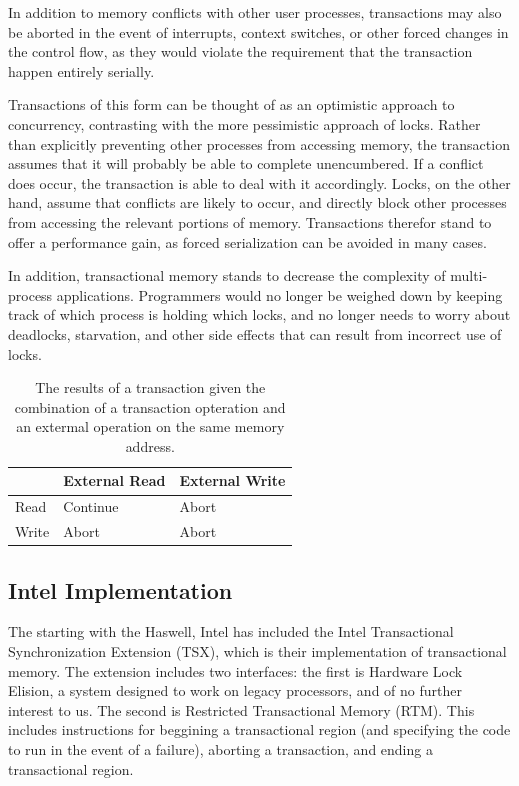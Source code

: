 \documentclass{acm_proc_article-sp}
\begin{document}
In addition to memory conflicts with other user processes, 
transactions may also be aborted in the event of interrupts, context switches,
or other forced changes in the control flow, as they would violate the
requirement that the transaction happen entirely serially. 

Transactions of this form can be thought of as an optimistic approach to
concurrency, contrasting with the more pessimistic approach of locks. 
Rather than explicitly preventing other processes from accessing memory, the
transaction assumes that it will probably be able to complete unencumbered. If
a conflict does occur, the transaction is able to deal with it accordingly.
Locks, on the other hand, assume that conflicts are likely to occur, and 
directly block other processes from accessing the relevant portions of memory.
Transactions therefor stand to offer a performance gain, as forced 
serialization can be avoided in many cases.

In addition, transactional memory stands to decrease the complexity of 
multi-process applications. Programmers would no longer be weighed down by 
keeping track of which process is holding which locks, and no longer needs
to worry about deadlocks, starvation, and other side effects that can result
from incorrect use of locks.

\begin{table}
\begin{center}
    \begin{tabular}{ l | l | l }
     & External Read & External Write \\
    \hline
    Read & Continue & Abort \\
    \hline
    Write & Abort & Abort \\
    \hline
    \end{tabular}
    \caption{The results of a transaction given the combination of a transaction
            opteration and an extermal operation on the same memory address.}
\label{results_table}
\end{center}
\end{table}


\subsection{Intel Implementation}

The starting with the Haswell, Intel has included the Intel Transactional
Synchronization Extension (TSX), which is their implementation of transactional
memory. The extension includes two interfaces: the first is Hardware Lock
Elision, a system designed to work on legacy processors, and of no further
interest to us. The second is Restricted Transactional Memory (RTM). This 
includes instructions for beggining a transactional region (and specifying the
code to run in the event of a failure), aborting a transaction, and ending a 
transactional region. \cite{intelsys, intelblog}
\end{document}
